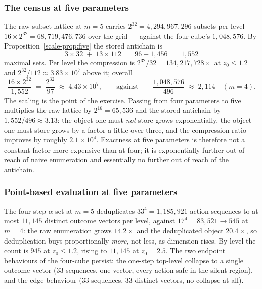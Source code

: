 \documentclass[10pt,twocolumn]{article}
\theoremstyle{plain}
\theoremstyle{definition}
\theoremstyle{remark}
\begin{document}
\subsubsection{The census at five parameters}

The raw subset lattice at \(m = 5\) carries \(2^{32} = 4{,}294{,}967{,}296\) subsets per
level --- \(16 \times 2^{32} = 68{,}719{,}476{,}736\) over the grid --- against the
four-cube's \(1{,}048{,}576\). By Proposition~\ref{scale-prop:five} the stored antichain is
\[
3 \times 32 \;+\; 13 \times 112 \;=\; 96 + 1{,}456 \;=\; 1{,}552
\]
maximal sets. Per level the compression is \(2^{32}/32 = 134{,}217{,}728\times\) at
\(z_{0} \le 1.2\) and \(2^{32}/112 \approx 3.83 \times 10^{7}\) above it; overall
\[
\frac{16 \times 2^{32}}{1{,}552} \;=\; \frac{2^{32}}{97} \;\approx\; 4.43 \times 10^{7},
\qquad\text{against}\qquad
\frac{1{,}048{,}576}{496} \;\approx\; 2{,}114 \quad (m = 4).
\]
The scaling is the point of the exercise. Passing from four parameters to five multiplies
the raw lattice by \(2^{16} = 65{,}536\) and the stored antichain by \(1{,}552/496 \approx
3.13\): the object one must \emph{not} store grows exponentially, the object one must store
grows by a factor a little over three, and the compression ratio improves by roughly
\(2.1 \times 10^{4}\). Exactness at five parameters is therefore not a constant factor more
expensive than at four; it is exponentially further out of reach of naive enumeration and
essentially no further out of reach of the antichain.

\subsubsection{Point-based evaluation at five parameters}

The four-step \(\alpha\)-set at \(m = 5\) deduplicates \(33^{4} = 1{,}185{,}921\) action
sequences to at most \(11{,}145\) distinct outcome vectors per level, against
\(17^{4} = 83{,}521 \to 545\) at \(m = 4\): the raw enumeration grows \(14.2\times\) and the
deduplicated object \(20.4\times\), so deduplication buys proportionally \emph{more}, not
less, as dimension rises. By level the count is \(945\) at \(z_{0} \le 1.2\), rising to
\(11{,}145\) at \(z_{0} = 2.5\). The two endpoint behaviours of the four-cube persist: the
one-step top-level collapse to a single outcome vector (\(33\) sequences, one vector, every
action safe in the silent region), and the edge behaviour (\(33\) sequences, \(33\) distinct
vectors, no collapse at all).
\end{document}
